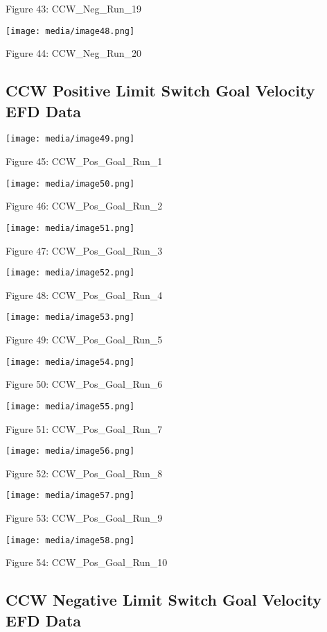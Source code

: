 \documentclass[SE,lsstdraft,authoryear,toc]{lsstdoc}
\begin{document}
Figure 43: CCW\_Neg\_Run\_19

\texttt{[image: media/image48.png]}

Figure 44: CCW\_Neg\_Run\_20

\hypertarget{ccw-positive-limit-switch-goal-velocity-efd-data}{%
\subsection{CCW Positive Limit Switch Goal Velocity EFD
Data}\label{ccw-positive-limit-switch-goal-velocity-efd-data}}

\texttt{[image: media/image49.png]}

Figure 45: CCW\_Pos\_Goal\_Run\_1

\texttt{[image: media/image50.png]}

Figure 46: CCW\_Pos\_Goal\_Run\_2

\texttt{[image: media/image51.png]}

Figure 47: CCW\_Pos\_Goal\_Run\_3

\texttt{[image: media/image52.png]}

Figure 48: CCW\_Pos\_Goal\_Run\_4

\texttt{[image: media/image53.png]}

Figure 49: CCW\_Pos\_Goal\_Run\_5

\texttt{[image: media/image54.png]}

Figure 50: CCW\_Pos\_Goal\_Run\_6

\texttt{[image: media/image55.png]}

Figure 51: CCW\_Pos\_Goal\_Run\_7

\texttt{[image: media/image56.png]}

Figure 52: CCW\_Pos\_Goal\_Run\_8

\texttt{[image: media/image57.png]}

Figure 53: CCW\_Pos\_Goal\_Run\_9

\texttt{[image: media/image58.png]}

Figure 54: CCW\_Pos\_Goal\_Run\_10

\hypertarget{ccw-negative-limit-switch-goal-velocity-efd-data}{%
\subsection{CCW Negative Limit Switch Goal Velocity EFD
Data}\label{ccw-negative-limit-switch-goal-velocity-efd-data}}
\end{document}

